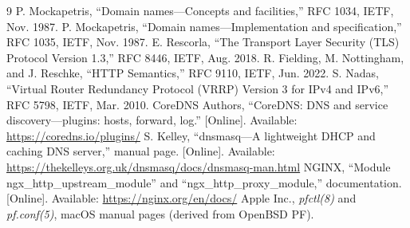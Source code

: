 \documentclass[conference]{IEEEtran}
\begin{document}
\begin{thebibliography}{9}
 P. Mockapetris, ``Domain names---Concepts and facilities,'' RFC 1034, IETF, Nov. 1987.
 P. Mockapetris, ``Domain names---Implementation and specification,'' RFC 1035, IETF, Nov. 1987.
 E. Rescorla, ``The Transport Layer Security (TLS) Protocol Version 1.3,'' RFC 8446, IETF, Aug. 2018.
 R. Fielding, M. Nottingham, and J. Reschke, ``HTTP Semantics,'' RFC 9110, IETF, Jun. 2022.
 S. Nadas, ``Virtual Router Redundancy Protocol (VRRP) Version 3 for IPv4 and IPv6,'' RFC 5798, IETF, Mar. 2010.
 CoreDNS Authors, ``CoreDNS: DNS and service discovery---plugins: hosts, forward, log.'' [Online]. Available: \url{https://coredns.io/plugins/}
 S. Kelley, ``dnsmasq---A lightweight DHCP and caching DNS server,'' manual page. [Online]. Available: \url{https://thekelleys.org.uk/dnsmasq/docs/dnsmasq-man.html}
 NGINX, ``Module ngx\_http\_upstream\_module'' and ``ngx\_http\_proxy\_module,'' documentation. [Online]. Available: \url{https://nginx.org/en/docs/}
 Apple Inc., \textit{pfctl(8)} and \textit{pf.conf(5)}, macOS manual pages (derived from OpenBSD PF).
\end{thebibliography}
\end{document}
